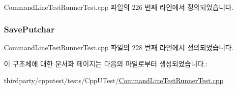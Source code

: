 Command\+Line\+Test\+Runner\+Test.\+cpp 파일의 226 번째 라인에서 정의되었습니다.

\subsubsection[{\texorpdfstring{Save\+Putchar}{SavePutchar}}]{ Save\+Putchar\hspace{0.3cm}{\ttfamily [private]}}\hypertarget{struct_fake_output_a224a3276595572e59b4ae35e848ad8ec}{}\label{struct_fake_output_a224a3276595572e59b4ae35e848ad8ec}


Command\+Line\+Test\+Runner\+Test.\+cpp 파일의 228 번째 라인에서 정의되었습니다.



이 구조체에 대한 문서화 페이지는 다음의 파일로부터 생성되었습니다.\+:\begin{DoxyCompactItemize}
\item 
thirdparty/cpputest/tests/\+Cpp\+U\+Test/\hyperlink{_command_line_test_runner_test_8cpp}{Command\+Line\+Test\+Runner\+Test.\+cpp}\end{DoxyCompactItemize}
